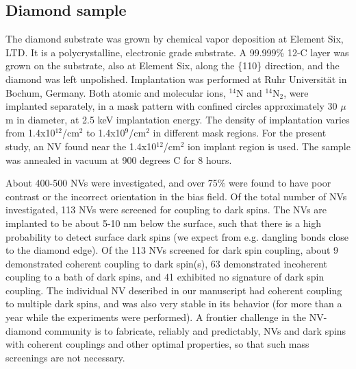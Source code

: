 \documentclass[%
 reprint,
 amsmath,amssymb,
 aps,
]{revtex4-1}
\begin{document}
\subsection{Diamond sample}
The diamond substrate was grown by chemical vapor deposition at Element Six, LTD. It is a polycrystalline, electronic grade substrate. A 99.999\% 12-C layer was grown on the substrate, also at Element Six, along the \{110\} direction, and the diamond was left unpolished. Implantation was performed at Ruhr Universität in Bochum, Germany. Both atomic and molecular ions, $^{14}$N and $^{14}$N$_{2}$, were implanted separately, in a mask pattern with confined circles approximately 30 $\mu$m in diameter, at 2.5 keV implantation energy. The density of implantation varies from 1.4x10$^{12}$/cm$^2$ to 1.4x10$^{9}$/cm$^2$ in different mask regions. For the present study, an NV found near the 1.4x10$^{12}$/cm$^2$ ion implant region is used. The sample was annealed in vacuum at 900 degrees C for 8 hours. 

About 400-500 NVs were investigated, and over 75\% were found to have poor contrast or the incorrect orientation in the bias field. Of the total number of NVs investigated, 113 NVs were screened for coupling to dark spins. The NVs are implanted to be about 5-10 nm below the surface, such that there is a high probability to detect surface dark spins (we expect from e.g. dangling bonds close to the diamond edge). Of the 113 NVs screened for dark spin coupling, about 9 demonstrated coherent coupling to dark spin(s), 63 demonstrated incoherent coupling to a bath of dark spins, and 41 exhibited no signature of dark spin coupling. The individual NV described in our manuscript had coherent coupling to multiple dark spins, and was also very stable in its behavior (for more than a year while the experiments were performed).  A frontier challenge in the NV-diamond community is to fabricate, reliably and predictably, NVs and dark spins with coherent couplings and other optimal properties, so that such mass screenings are not necessary.
\end{document}
